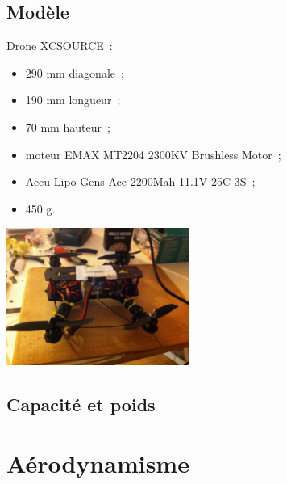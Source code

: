 \documentclass{beamer}
\begin{document}
\subsection{Modèle}

\begin{frame}
  \begin{multicols}{2}
    Drone XCSOURCE~: \\
    \begin{itemize}
      \item 290 mm diagonale~;
      \item 190 mm longueur~;
      \item 70 mm hauteur~;
      \item moteur EMAX MT2204 2300KV Brushless Motor~;
      \item Accu Lipo Gens Ace 2200Mah 11.1V 25C 3S~;
      \item 450 g.
    \end{itemize}
    \newpage
    \begin{center}
      \includegraphics[width=6cm]{../Images/drone.JPG}
    \end{center}
  \end{multicols}
\end{frame}

\subsection{Capacité et poids}

\section{Aérodynamisme}
\end{document}
